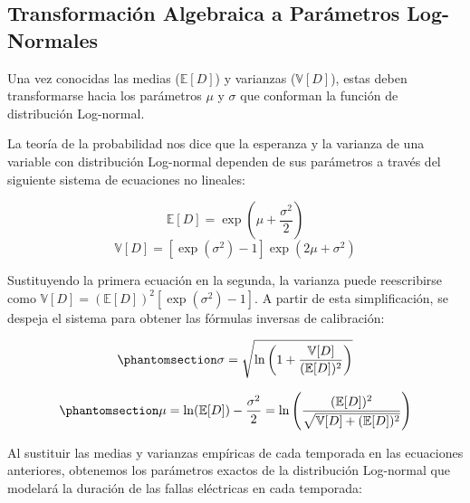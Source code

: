 \documentclass[
  spanish,
  us-letterpaper,
]{scrreprt}
\numberwithin{equation}{section}
\theoremstyle{plain}
\theoremstyle{plain}
\theoremstyle{plain}
\theoremstyle{definition}
\theoremstyle{remark}
\begin{document}
\subsection{Transformación Algebraica a Parámetros
Log-Normales}\label{transformaciuxf3n-algebraica-a-paruxe1metros-log-normales}

Una vez conocidas las medias (\(\mathbb{E}[D]\)) y varianzas
(\(\mathbb{V}[D]\)), estas deben transformarse hacia los parámetros
\(\mu\) y \(\sigma\) que conforman la función de distribución
Log-normal.

La teoría de la probabilidad nos dice que la esperanza y la varianza de
una variable con distribución Log-normal dependen de sus parámetros a
través del siguiente sistema de ecuaciones no lineales:

\[
\mathbb{E}[D] = \exp\left(\mu + \frac{\sigma^2}{2}\right)
\] \[
\mathbb{V}[D] = \left[\exp(\sigma^2) - 1\right] \exp(2\mu + \sigma^2)
\]

Sustituyendo la primera ecuación en la segunda, la varianza puede
reescribirse como
\(\mathbb{V}[D] = (\mathbb{E}[D])^2 \left[\exp(\sigma^2) - 1\right]\). A
partir de esta simplificación, se despeja el sistema para obtener las
fórmulas inversas de calibración:

\begin{equation}\phantomsection\label{eq-sigma-lognormal}{
\sigma = \sqrt{\ln\left(1 + \frac{\mathbb{V}[D]}{(\mathbb{E}[D])^2}\right)}
}\end{equation}

\begin{equation}\phantomsection\label{eq-mu-lognormal}{
\mu = \ln(\mathbb{E}[D]) - \frac{\sigma^2}{2} = \ln\left( \frac{(\mathbb{E}[D])^2}{\sqrt{\mathbb{V}[D] + (\mathbb{E}[D])^2}} \right)
}\end{equation}

Al sustituir las medias y varianzas empíricas de cada temporada en las
ecuaciones anteriores, obtenemos los parámetros exactos de la
distribución Log-normal que modelará la duración de las fallas
eléctricas en cada temporada:
\end{document}
